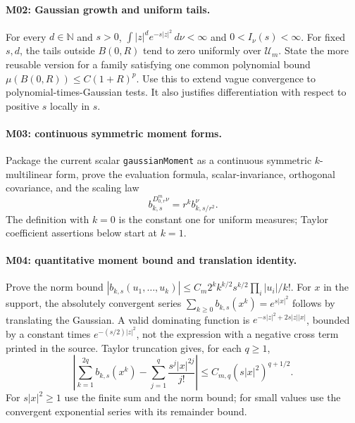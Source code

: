 \paragraph{M02: Gaussian growth and uniform tails.}
For every $d\in\mathbb N$ and $s>0$,
$\int |z|^d e^{-s|z|^2}\,d\nu<\infty$ and $0<I_\nu(s)<\infty$.
For fixed $s,d$, the tails outside $B(0,R)$ tend to zero uniformly over
$\mathcal U_m$. State the more reusable version for a family satisfying one
common polynomial bound $\mu(B(0,R))\leq C(1+R)^p$.
Use this to extend vague convergence to polynomial-times-Gaussian tests.
It also justifies differentiation with respect to positive $s$ locally in $s$.

\paragraph{M03: continuous symmetric moment forms.}
Package the current scalar \texttt{gaussianMoment} as a continuous symmetric
$k$-multilinear form, prove the evaluation formula, scalar-invariance,
orthogonal covariance, and the scaling law
\[
 b^{D^m_{0,r}\nu}_{k,s}=r^k b^\nu_{k,s/r^2}.
\]
The definition with $k=0$ is the constant one for uniform measures; Taylor
coefficient assertions below start at $k=1$.

\paragraph{M04: quantitative moment bound and translation identity.}
Prove the norm bound
$|b_{k,s}(u_1,\ldots,u_k)|\leq
C_m 2^k k^{k/2}s^{k/2}\prod_i|u_i|/k!$.
For $x$ in the support, the absolutely convergent series
$\sum_{k\geq0} b_{k,s}(x^k)=e^{s|x|^2}$ follows by translating the
Gaussian. A valid dominating function is
$e^{-s|z|^2+2s|z||x|}$, bounded by a constant times
$e^{-(s/2)|z|^2}$, not the expression with a negative cross term printed in
the source. Taylor truncation gives, for each $q\geq1$,
\[
 \left|\sum_{k=1}^{2q}b_{k,s}(x^k)
 -\sum_{j=1}^{q}\frac{s^j|x|^{2j}}{j!}\right|
 \leq C_{m,q}(s|x|^2)^{q+1/2}.
\]
For $s|x|^2\geq1$ use the finite sum and the norm bound; for small values use
the convergent exponential series with its remainder bound.

